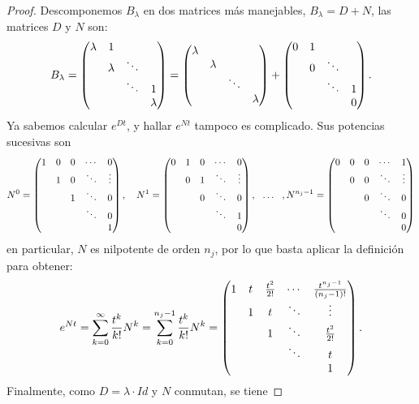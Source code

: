 \documentclass[../ecuaciones_diferenciales.tex]{subfiles}
\begin{document}
\begin{proof}
	Descomponemos \(B_\lambda\) en dos matrices más manejables, 
	\(B_\lambda = D + N\), las matrices \(D\) y \(N\) son:
	\[B_\lambda = 
		\begin{pmatrix}\lambda & 1 & & \\ & \lambda & \ddots & \\ & & \ddots & 1 \\ & &
			& \lambda\end{pmatrix} =
		\begin{pmatrix}\lambda & & & \\ & \lambda & & \\ & & \ddots & \\ & & & \lambda\end{pmatrix}
		+ \begin{pmatrix}0 & 1 & & \\ & 0 & \ddots & \\ & & \ddots & 1 \\ & & & 0\end{pmatrix}.\]
	Ya sabemos calcular \(e^{Dt}\), y hallar \(e^{Nt}\) tampoco es complicado. Sus
	potencias sucesivas son
	\[
		N^0 = \begin{pmatrix}1 & 0 & 0 & \cdots & 0      \\
			& 1 & 0 & \ddots & \vdots \\
			&   & 1 & \ddots & 0      \\
			&   &   & \ddots & 0      \\
			&   &   &        & 1 \end{pmatrix}, \quad
		N^1 = \begin{pmatrix}0 & 1 & 0 & \cdots & 0      \\
			& 0 & 1 & \ddots & \vdots \\
			&   & 0 & \ddots & 0      \\
			&   &   & \ddots & 1      \\
			&   &   &        & 0 \end{pmatrix}, \ \ \dots \ \ ,
		N^{n_j-1} = \begin{pmatrix}0 & 0 & 0 & \cdots & 1      \\
			& 0 & 0 & \ddots & \vdots \\
			&   & 0 & \ddots & 0      \\
			&   &   & \ddots & 0      \\
			&   &   &        & 0 \end{pmatrix}
	\]
	en particular, \(N\) es nilpotente de orden \(n_j\), por lo que basta
	aplicar la definición para obtener:
	\[e^{Nt} = \sum_{k=0}^\infty \frac{t^k}{k!}N^k = \sum_{k=0}^{n_j-1}
		\frac{t^k}{k!}N^k =
		\begin{pmatrix}1 & t & \frac{t^2}{2!} & \cdots & \frac{t^{n_j-1}}{(n_j-1)!} \\
			& 1 & t              & \ddots & \vdots                    \\
			&   & 1              & \ddots & \frac{t^2}{2!}            \\
			&   &                & \ddots & t                         \\
			&   &                &        & 1 \end{pmatrix}.
	\]
	Finalmente, como \(D = \lambda \cdot Id\) y \(N\) conmutan, se tiene

\end{proof}
\end{document}
